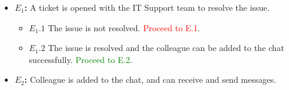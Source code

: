 \documentclass[]{article}
\begin{document}
\begin{enumerate}[\bf {BE}7.]
{{\begin{itemize}
                    \item {\bf $E_{1}$:}  A ticket is opened with the IT Support team to resolve the issue.
                     \begin{itemize}
                        \item {\bf $E_{1}.1$} The issue is not resolved. \textcolor{red}{Proceed to E.1}.
                        \item {\bf $E_{1}.2$} The issue is resolved and the colleague can be added to the chat successfully. \textcolor{green}{Proceed to E.2}.
                    \end{itemize}
		\item {\bf $E_{2}$:}  Colleague is added to the chat, and can receive and send messages.
                            
				\end{itemize}
			}%
		}%
		\end{enumerate}
\end{document}
